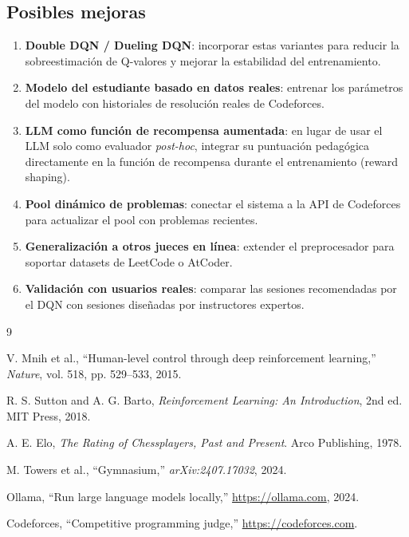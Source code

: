\documentclass[12pt, a4paper]{article}
\begin{document}
\subsection{Posibles mejoras}

\begin{enumerate}
  \item \textbf{Double DQN / Dueling DQN}: incorporar estas variantes para
    reducir la sobreestimación de Q-valores y mejorar la estabilidad del
    entrenamiento.
  \item \textbf{Modelo del estudiante basado en datos reales}: entrenar los
    parámetros del modelo con historiales de resolución reales de Codeforces.
  \item \textbf{LLM como función de recompensa aumentada}: en lugar de
    usar el LLM solo como evaluador \textit{post-hoc}, integrar su puntuación
    pedagógica directamente en la función de recompensa durante el
    entrenamiento (reward shaping).
  \item \textbf{Pool dinámico de problemas}: conectar el sistema a la API
    de Codeforces para actualizar el pool con problemas recientes.
  \item \textbf{Generalización a otros jueces en línea}: extender el preprocesador
    para soportar datasets de LeetCode o AtCoder.
  \item \textbf{Validación con usuarios reales}: comparar las sesiones
    recomendadas por el DQN con sesiones diseñadas por instructores expertos.
\end{enumerate}

\begin{thebibliography}{9}

V. Mnih et al.,
``Human-level control through deep reinforcement learning,''
\textit{Nature}, vol. 518, pp. 529--533, 2015.

R. S. Sutton and A. G. Barto,
\textit{Reinforcement Learning: An Introduction}, 2nd ed.
MIT Press, 2018.

A. E. Elo,
\textit{The Rating of Chessplayers, Past and Present}.
Arco Publishing, 1978.

M. Towers et al.,
``Gymnasium,''
\textit{arXiv:2407.17032}, 2024.

Ollama,
``Run large language models locally,''
\url{https://ollama.com}, 2024.

Codeforces,
``Competitive programming judge,''
\url{https://codeforces.com}.

\end{thebibliography}
\end{document}
